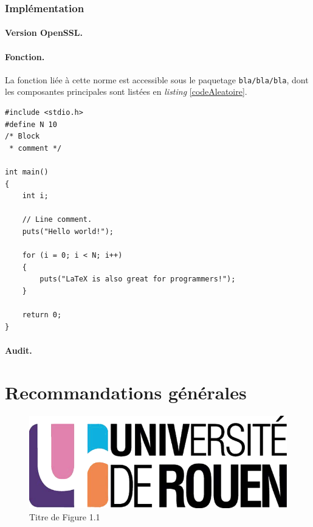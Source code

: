 	\subsubsection{Implémentation}
		
		\paragraph{Version OpenSSL.\\}
		
		\paragraph{Fonction.\\}
		La fonction liée à cette norme est accessible sous le paquetage \texttt{bla/bla/bla}, dont les composantes principales sont listées en \textit{listing} \ref{codeAleatoire}.
		
		
		\begin{lstlisting}[style=customc,caption=codeAleatoire.c, label=codeAleatoire]
#include <stdio.h>
#define N 10
/* Block
 * comment */
 
int main()
{
    int i;
 
    // Line comment.
    puts("Hello world!");
 
    for (i = 0; i < N; i++)
    {
        puts("LaTeX is also great for programmers!");
    }
 
    return 0;
}
		\end{lstlisting}
		
		
		
		\paragraph{Audit.\\}



\section{Recommandations générales}




\begin{figure}[H]
	\centering
	\includegraphics[scale=0.2]{images/logo_univ.png}
	\caption{Titre de Figure 1.1}
	\label{fig1}
\end{figure}